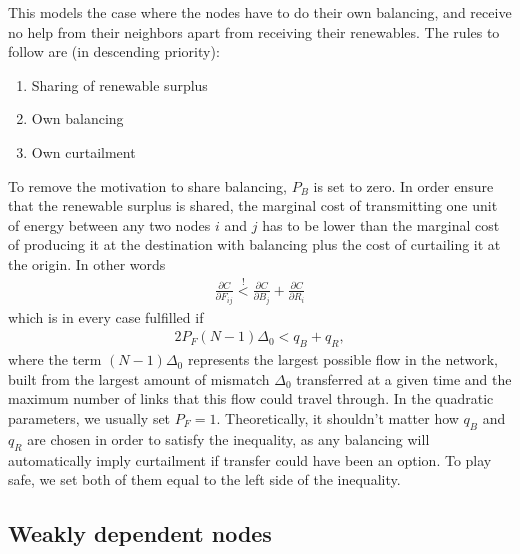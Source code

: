 \documentclass[english,twoside,a4paper,11pt]{article}
\numberwithin{equation}{section}
\begin{document}
This models the case where the nodes have to do their own balancing,
and receive no help from their neighbors apart from receiving their
renewables. The rules to follow are (in descending priority):
\begin{enumerate}
\item Sharing of renewable surplus
\item Own balancing
\item Own curtailment
\end{enumerate}
To remove the motivation to share balancing, $P_B$ is set to zero. In
order ensure that the renewable surplus is shared, the marginal cost
of transmitting one unit of energy between any two nodes $i$ and $j$
has to be lower than the marginal cost of producing it at the
destination with balancing plus the cost of curtailing it at the
origin. In other words 
\begin{align}
\frac{\partial C}{\partial F_{ij}} \stackrel{!}{<}
\frac{\partial C}{\partial B_j} +\frac{\partial C}{\partial R_i}
\label{eq:trans1}
\end{align}
which is in every case fulfilled if
\begin{align*}
2P_F ( N-1) \Delta_0 < q_B + q_R,
\end{align*}
where the term $(N-1)\Delta_0$ represents the largest possible flow in
the network, built from the largest amount of mismatch $\Delta_0$
transferred at a given time and the maximum number of links that this flow
could travel through. In the quadratic parameters, we usually set $P_F
=1$. Theoretically, it shouldn't matter how $q_B$ and $q_R$ are chosen
in order to satisfy the inequality, as any balancing will automatically
imply curtailment if transfer could have been an option. To play
safe, we set both of them equal to the left side of the inequality.

\subsection{Weakly dependent nodes}
\end{document}

